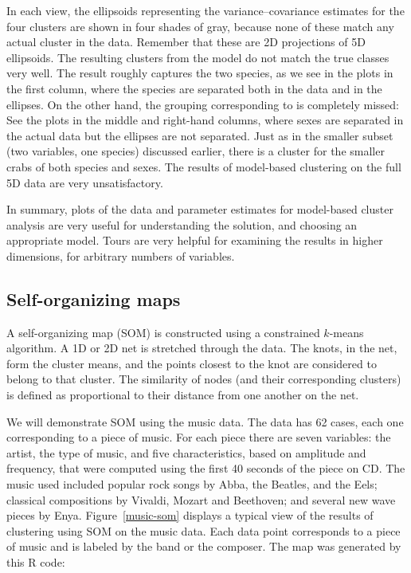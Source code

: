 \noindent In each view, the ellipsoids representing the
variance--covariance estimates for the four clusters are shown in four
shades of gray, because none of these match any actual cluster in the
data.  Remember that these are 2D projections of 5D ellipsoids.  The
resulting clusters from the model do not match the true classes very
well.  The result roughly captures the two species, as we see in the
plots in the first column, where the species are separated both in the
data and in the ellipses.  On the other hand, the grouping
corresponding to  is completely missed: See the plots in the
middle and right-hand columns, where sexes are separated in the actual
data but the ellipses are not separated. Just as in the smaller subset
(two variables, one species) discussed earlier, there is a cluster for
the smaller crabs of both species and sexes.  The results of
model-based clustering on the full 5D data are very unsatisfactory.

In summary, plots of the data and parameter estimates for model-based
cluster analysis are very useful for understanding the solution, and
choosing an appropriate model. Tours are very helpful for examining
the results in higher dimensions, for arbitrary numbers of variables.



\subsection{Self-organizing maps}

A self-organizing map (SOM) \cite{Ko01} is constructed using a
constrained $k$-means algorithm. A 1D or 2D net is stretched through
the data. The knots, in the net, form the cluster means, and the
points closest to the knot are considered to belong to that cluster.
The similarity of nodes (and their corresponding clusters) is defined
as proportional to their distance from one another on the net.

We will demonstrate SOM using the music data. The data has 62 cases,
each one corresponding to a piece of music.  For each piece there are
seven variables: the artist, the type of music, and five
characteristics, based on amplitude and frequency, that were computed
using the first 40 seconds of the piece on CD.  The music used
included popular rock songs by Abba, the Beatles, and the Eels;
classical compositions by Vivaldi, Mozart and Beethoven; and several
new wave pieces by Enya. Figure~\ref{music-som} displays a typical
view of the results of clustering using SOM on the music data. Each
data point corresponds to a piece of music and is labeled by the band
or the composer. The map was generated by this R code:

